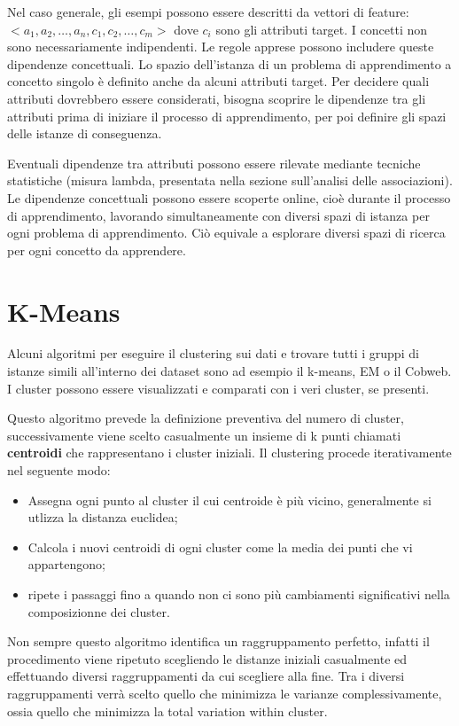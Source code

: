 \documentclass[a4paper]{extarticle}
\begin{document}
Nel caso generale, gli esempi possono essere descritti da vettori di feature: $<a_1,a_2,\dots,a_n,c_1,c_2,\dots,c_m>$ dove $c_i$ sono gli attributi target. I concetti non sono necessariamente indipendenti. Le regole apprese possono includere queste dipendenze concettuali. Lo spazio dell'istanza di un problema di apprendimento a concetto singolo è definito anche da alcuni attributi target. Per decidere quali attributi dovrebbero essere considerati, bisogna scoprire le dipendenze tra gli attributi prima di iniziare il processo di apprendimento, per poi definire gli spazi delle istanze di conseguenza.

Eventuali dipendenze tra attributi possono essere rilevate mediante tecniche statistiche (misura lambda, presentata nella sezione sull'analisi delle associazioni). Le dipendenze concettuali possono essere scoperte online, cioè durante il processo di apprendimento, lavorando simultaneamente con diversi spazi di istanza per ogni problema di apprendimento. Ciò equivale a esplorare diversi spazi di ricerca per ogni concetto da apprendere.

\newpage

\section{K-Means}

Alcuni algoritmi per eseguire il clustering sui dati e trovare tutti i gruppi di istanze simili all'interno dei dataset sono ad esempio il k-means, EM o il Cobweb. I cluster possono essere visualizzati e comparati con i veri cluster, se presenti.

Questo algoritmo prevede la definizione preventiva del numero di cluster, successivamente viene scelto casualmente un insieme di k punti chiamati \textbf{centroidi} che rappresentano i cluster iniziali. Il clustering procede iterativamente nel seguente modo:

\begin{itemize}
\item Assegna ogni punto al cluster il cui centroide è più vicino, generalmente si utlizza la distanza euclidea;
\item Calcola i nuovi centroidi di ogni cluster come la media dei punti che vi appartengono;
\item ripete i passaggi fino a quando non ci sono più cambiamenti significativi nella composizionne dei cluster.
\end{itemize}

Non sempre questo algoritmo identifica un raggruppamento perfetto, infatti il procedimento viene ripetuto scegliendo le distanze iniziali casualmente ed effettuando diversi raggruppamenti da cui scegliere alla fine. Tra i diversi raggruppamenti verrà scelto quello che minimizza le varianze complessivamente, ossia quello che minimizza la total variation within cluster.
\end{document}
